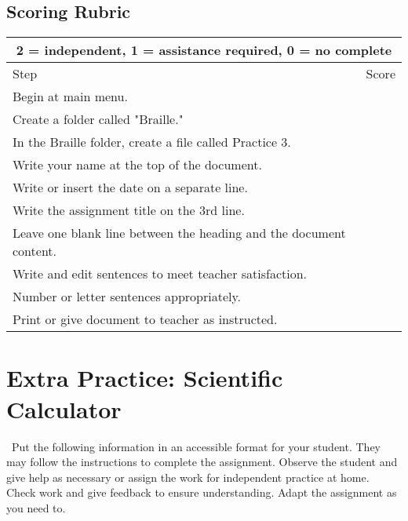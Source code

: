 \documentclass[10pt,letterpaper,twoside]{report}
\begin{document}
{\subsection{Scoring Rubric}
{
\renewcommand{\arraystretch}{1.5}
\begin{table}[!htbp]
	\centering
	\begin{tabular}{|l|r|}
		\hline
		\multicolumn{2}{|c|}{2 = independent, 1 = assistance required, 0 = no complete} \\
		\hline
		Step                                                               & Score \\[.5em]
		\hline
		Begin at main menu.                                                &       \\ \hline	
		Create a folder called "Braille."                                  &       \\ \hline	
		In the Braille folder, create a file called Practice 3.            &       \\ \hline		
		Write your name at the top of the document.                        &       \\ \hline		
		Write or insert the date on a separate line.                       &       \\ \hline		
		Write the assignment title on the 3rd line.                        &       \\ \hline		
		Leave one blank line between the heading and the document content. &       \\ \hline		
		Write and edit sentences to meet teacher satisfaction.             &       \\ \hline		
		Number or letter sentences appropriately.                          &       \\ \hline
		Print or give document to teacher as instructed.                   &       \\ \hline
	\end{tabular}
	
\end{table}
\clearpage
\section{Extra Practice: Scientific Calculator}
\
Put the following information in an accessible format for your student. They may follow the instructions to complete the assignment. Observe the student and give help as necessary or assign the work for independent practice at home. Check work and give feedback to ensure understanding. Adapt the assignment as you need to.
}}
\end{document}
